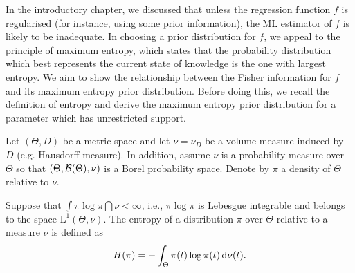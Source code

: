 In the introductory chapter, we discussed that unless the regression function $f$ is regularised (for instance, using some prior information), the ML estimator of $f$ is likely to be inadequate.
In choosing a prior distribution for $f$, we appeal to the principle of maximum entropy, which states that the probability distribution which best represents the current state of knowledge is the one with largest entropy.
We aim to show the relationship between the Fisher information for $f$ and its maximum entropy prior distribution.
Before doing this, we recall the definition of entropy and derive the maximum entropy prior distribution for a parameter which has unrestricted support.

Let $(\Theta,D)$ be a metric space and let $\nu = \nu_D$ be a volume measure induced by $D$ (e.g. Hausdorff measure).
In addition, assume $\nu$ is a probability measure over $\Theta$ so that $(\Theta,{\mathcal B}(\Theta),\nu)$ is a Borel probability space.
Denote by $\pi$ a density of $\Theta$ relative to $\nu$.

\begin{definition}[Entropy]
  Suppose that $\int \pi\log\pi \dint \nu < \infty$, i.e., $\pi \log\pi$ is Lebesgue integrable and belongs to the space $\text{L}^1(\Theta,\nu)$.
  The entropy of a distribution $\pi$ over $\Theta$ relative to a measure $\nu$ is defined as
  \[
    H(\pi) = - \int_\Theta \pi(t) \log \pi(t) \, \text{d}\nu(t).
  \]
\end{definition}

